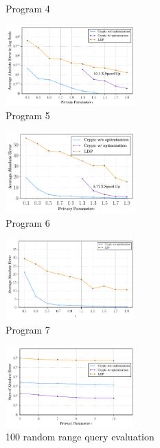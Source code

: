 \begin{figure}
\begin{subfigure}[b]{0.3\textwidth}
        \caption{Program 4}
        \label{fig:mouse}\end{subfigure}
          \begin{subfigure}[b]{0.3\textwidth}
    \qquad    \includegraphics[width=5cm,height=3.1cm]{t5.pdf}
        \caption{Program 5}
        \label{fig:mouse}\end{subfigure}
          \begin{subfigure}[b]{0.3\textwidth}
    \qquad    \includegraphics[width=5cm,height=3.1cm]{t6.pdf}
        \caption{Program 6}
        \label{fig:mouse}\end{subfigure}
          \begin{subfigure}[b]{0.3\textwidth}
    \qquad    \includegraphics[width=5cm,height=3.1cm]{test7.pdf}
        \caption{Program 7}
        \label{fig:mouse}
    \end{subfigure}
    \begin{subfigure}[b]{0.3\textwidth}
    \qquad    \includegraphics[width=5cm,height=3.1cm]{range.pdf}
        \caption{100 random range query evaluation}
        \label{rangetree}
        \end{subfigure}
        \begin{subfigure}[b]{0.3\textwidth}

\end{subfigure}
\end{figure}
